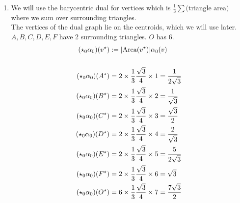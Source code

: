\documentclass{article}
\newcommand\ifrac[2]{{\displaystyle\frac{#1}{#2}}}
\def\nt{\notag}
\begin{document}
\begin{enumerate}[label=(\alph*)]
    \item
    We will use the barycentric dual for vertices which is $\ifrac13 \sum\text{(triangle area)}$ where we sum over surrounding triangles.\\
    The vertices of the dual graph lie on the centroids, which we will use later.\\
    $A,B,C,D,E,F$ have 2 surrounding triangles. $O$ has 6. 
    \begin{align}
        (\star_0\alpha_0)(v^\star) &:= |\text{Area}(v^\star)|\alpha_0(v) \nt\\\nt\\
        (\star_0\alpha_0)(A^\star) &= 2 \times \frac13 \frac{\sqrt3}{4} \times 1 = \frac{1}{2 \sqrt{3}} \nt\\
        (\star_0\alpha_0)(B^\star) &= 2 \times \frac13 \frac{\sqrt3}{4} \times 2 = \frac{1}{\sqrt{3}} \nt\\
        (\star_0\alpha_0)(C^\star) &= 2 \times \frac13 \frac{\sqrt3}{4} \times 3 = \frac{\sqrt{3}}{2} \nt\\
        (\star_0\alpha_0)(D^\star) &= 2 \times \frac13 \frac{\sqrt3}{4} \times 4 = \frac{2}{\sqrt{3}} \nt\\
        (\star_0\alpha_0)(E^\star) &= 2 \times \frac13 \frac{\sqrt3}{4} \times 5 = \frac{5}{2 \sqrt{3}} \nt\\
        (\star_0\alpha_0)(F^\star) &= 2 \times \frac13 \frac{\sqrt3}{4} \times 6 = \sqrt{3} \nt\\
        (\star_0\alpha_0)(O^\star) &= 6 \times \frac13 \frac{\sqrt3}{4} \times 7 = \frac{7 \sqrt{3}}{2} \nt
    \end{align}


\end{enumerate}
\end{document}
